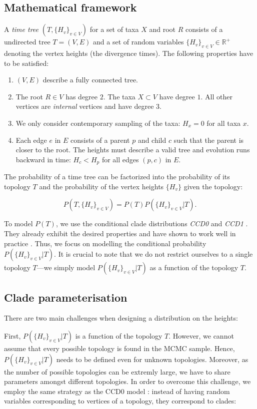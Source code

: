 \documentclass[10pt,letterpaper]{article}
\newcommand{\Pro}[1]{P\left(#1\right)}
\begin{document}
\subsection*{Mathematical framework}

A \emph{time tree} $(T, \{H_v\}_{v \in V})$ for a set of taxa $X$ and root $R$ consists of a undirected tree $T = (V, E)$ and a set of random variables $\{H_v\}_{v \in V} \in \mathbb{R}^+$ denoting the vertex heights (the divergence times). The following properties have to be satisfied:

\begin{enumerate}
	\item $(V, E)$ describe a fully connected tree.
	\item The root $R \in V$ has degree $2$. The taxa $X \subset V$ have degree $1$. All other vertices are \emph{internal} vertices and have degree $3$.
	\item We only consider contemporary sampling of the taxa: $H_x = 0$ for all taxa $x$.
	\item Each edge $e$ in $E$ consists of a parent $p$ and child $c$ such that the parent is closer to the root. The heights must describe a valid tree and evolution runs backward in time: $H_c < H_p$ for all edges $(p, c)$ in $E$.
\end{enumerate}

The probability of a time tree can be factorized into the probability of its topology $T$ and the probability of the vertex heights $\{H_v\}$ given the topology:

$$
\Pro{T, \{H_v\}_{v \in V}} = \Pro{T} \Pro{\{H_v\}_{v \in V} | T}.
$$

To model $\Pro{T}$, we use the conditional clade distributions \emph{CCD0} and \emph{CCD1} \cite{ccd,ccdlarget}. They already exhibit the desired properties and have shown to work well in practice \cite{ccd,ccd0expansion,hipstr}. Thus, we focus on modelling the conditional probability $\Pro{\{H_v\}_{v \in V} | T}$. It is crucial to note that we do not restrict ourselves to a single topology $T$---we simply model $\Pro{\{H_v\}_{v \in V} | T}$ as a function of the topology $T$.

\subsection*{Clade parameterisation}

There are two main challenges when designing a distribution on the heights:

First, $P\left(\{H_v\}_{v \in V} | T\right)$ is a function of the topology $T$. However, we cannot assume that every possible topology is found in the MCMC sample. Hence, $P\left(\{H_v\}_{v \in V} | T\right)$ needs to be defined even for unknown topologies. Moreover, as the number of possible topologies can be extremly large, we have to share parameters amongst different topologies. In order to overcome this challenge, we employ the same strategy as the CCD0 model \cite{ccd}: instead of having random variables corresponding to vertices of a topology, they correspond to clades:
\end{document}
